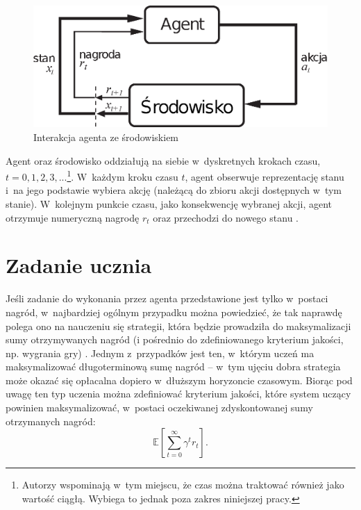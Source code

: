 \documentclass[a4paper, 12pt, oneside]{report}
\begin{document}
\begin{figure}[htp]
\centering
\includegraphics[scale=1.00]{rys/Agent-Env-pl.eps}
\caption{Interakcja agenta ze środowiskiem\protect\footnotemark}
\label{}
\end{figure}

Agent oraz środowisko oddziałują na siebie w~dyskretnych krokach czasu, $t = 0, 1, 2, 3, ...$\footnote{Autorzy \cite{SuttonBarto98} wspominają w~tym miejscu, że czas można traktować również jako wartość ciągłą. Wybiega to jednak poza zakres niniejszej pracy.}. W~każdym kroku czasu $t$, agent obserwuje reprezentację stanu i~na jego podstawie wybiera akcję (należącą do zbioru akcji dostępnych w~tym stanie). W~kolejnym punkcie czasu, jako konsekwencję wybranej akcji, agent otrzymuje numeryczną nagrodę $r_t$ oraz przechodzi do nowego stanu \cite{SuttonBarto98}.

\section{Zadanie ucznia}

Jeśli zadanie do wykonania przez agenta przedstawione jest tylko w~postaci nagród, w~najbardziej ogólnym przypadku można powiedzieć, że tak naprawdę polega ono na nauczeniu się strategii, która będzie prowadziła do maksymalizacji sumy otrzymywanych nagród (i pośrednio do zdefiniowanego kryterium jakości, np. wygrania gry) \cite{Cichosz00}. Jednym z~przypadków jest ten, w~którym uczeń ma maksymalizować długoterminową sumę nagród -- w~tym ujęciu dobra strategia może okazać się opłacalna dopiero w~dłuższym horyzoncie czasowym. Biorąc pod uwagę ten typ uczenia można zdefiniować kryterium jakości, które system uczący powinien maksymalizować, w~postaci oczekiwanej zdyskontowanej sumy otrzymanych nagród:
\begin{equation}
\mathbb{E}\left[\sum_{t=0}^\infty\gamma^t r_t\right].
\end{equation}
\end{document}

